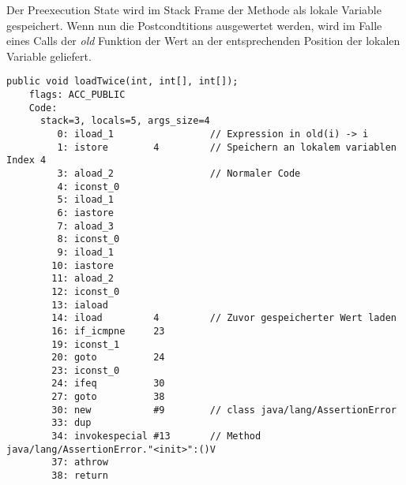 Der Preexecution State wird im Stack Frame der Methode als lokale Variable gespeichert. Wenn nun 
die Postcondtitions ausgewertet werden, wird im Falle eines Calls der \textit{old} Funktion der Wert 
an der entsprechenden Position der lokalen Variable geliefert.
\newline
\begin{lstlisting}[caption=Bytecode der loadTwice Prozedur mit postcondition mit Zugriff auf old State. Damit der Code etwas Übersichtlicher ist\, wurde nur die erste Postcondtition kompiliert.,label={lst:loadtwice_code_old}]
public void loadTwice(int, int[], int[]);
    flags: ACC_PUBLIC
    Code:
      stack=3, locals=5, args_size=4
         0: iload_1                 // Expression in old(i) -> i 
         1: istore        4         // Speichern an lokalem variablen Index 4
         3: aload_2                 // Normaler Code
         4: iconst_0      
         5: iload_1       
         6: iastore       
         7: aload_3       
         8: iconst_0      
         9: iload_1       
        10: iastore       
        11: aload_2       
        12: iconst_0      
        13: iaload        
        14: iload         4         // Zuvor gespeicherter Wert laden
        16: if_icmpne     23
        19: iconst_1      
        20: goto          24
        23: iconst_0      
        24: ifeq          30
        27: goto          38
        30: new           #9        // class java/lang/AssertionError
        33: dup           
        34: invokespecial #13       // Method java/lang/AssertionError."<init>":()V
        37: athrow        
        38: return
\end{lstlisting}


